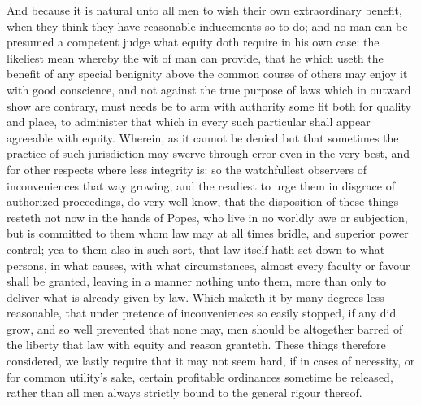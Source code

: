 And because it is natural unto all men to wish their own extraordinary benefit, when they think they have reasonable inducements so to do; and no man can be presumed a competent judge what equity doth require in his own case: the likeliest mean whereby the wit of man can provide, that he which useth the benefit of any special benignity above the common course of others may enjoy it with good conscience, and not against the true purpose of laws which in outward show are contrary, must needs be to arm with authority some fit both for quality and place, to administer that which in every such particular shall appear agreeable with equity. Wherein, as it cannot be denied but that sometimes the practice of such jurisdiction may swerve through error even in the very best, and for other respects where less integrity is: so the watchfullest observers of inconveniences that way growing, and the readiest to urge them in disgrace of authorized proceedings, do very well know, that the disposition of these things resteth not now in the hands of Popes, who live in no worldly awe or subjection, but is committed to them whom law may at all times bridle, and superior power control; yea to them also in such sort, that law itself hath set down to what persons, in what causes, with what circumstances, almost every faculty or favour shall be granted, leaving in a manner nothing unto them, more than only to deliver what is already given by law. Which maketh it by many degrees less reasonable, that under pretence of inconveniences so easily stopped, if any did grow, and so well prevented that none may, men should be altogether barred of the liberty that law with equity and reason granteth.
These things therefore considered, we lastly require that it may not seem hard, if in cases of necessity, or for common utility’s sake, certain profitable ordinances sometime  be released, rather than all men always strictly bound to the general rigour thereof.

